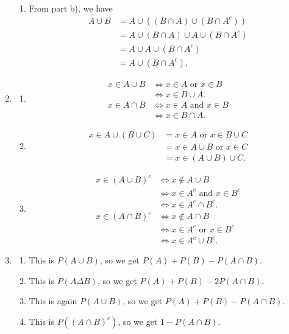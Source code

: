 \documentclass{article}
\begin{document}
\begin{enumerate}
\begin{enumerate}
        \item From part b), we have \begin{align*}
            A \cup B
            &= A \cup ((B \cap A) \cup (B \cap A^c)) \\
            &= A \cup (B \cap A) \cup A \cup (B \cap A^c) \\
            &= A \cup A \cup (B \cap A^c) \\
            &= A \cup (B \cap A^c).
        \end{align*}
    \end{enumerate}

    \item \begin{enumerate}
        \item \begin{align*}
            x \in A \cup B
            &\iff x \in A \text{ or } x \in B \\
            &\iff x \in B \cup A. \\
            x \in A \cap B
            &\iff x \in A \text{ and } x \in B \\
            &\iff x \in B \cap A.
        \end{align*}

        \item \begin{align*}
            x \in A \cup (B \cup C)
            &= x \in A \text{ or } x \in B \cup C \\
            &= x \in A \cup B \text{ or } x \in C \\
            &= x \in (A \cup B) \cup C.
        \end{align*}

        \item \begin{align*}
            x \in (A \cup B)^{c}
            &\iff x \notin A \cup B \\
            &\iff x \in A^c \text{ and } x \in B^c \\
            &\iff x \in A^c \cap B^c. \\
            x \in (A \cap B)^c
            &\iff x \notin A \cap B \\
            &\iff x \in A^c \text{ or } x \in B^c \\
            &\iff x \in A^c \cup B^c.
        \end{align*}
    \end{enumerate}

    \item \begin{enumerate}
        \item This is $P(A \cup B)$, so we get $P(A) + P(B) - P(A \cap B)$.
        \item This is $P(A \Delta B)$, so we get $P(A) + P(B) - 2P(A \cap B)$.
        \item This is again $P(A \cup B)$, so we get $P(A) + P(B) - P(A \cap B)$.
        \item This is $P((A \cap B)^c)$, so we get $1 - P(A \cap B)$.
    \end{enumerate}


\end{enumerate}
\end{document}
